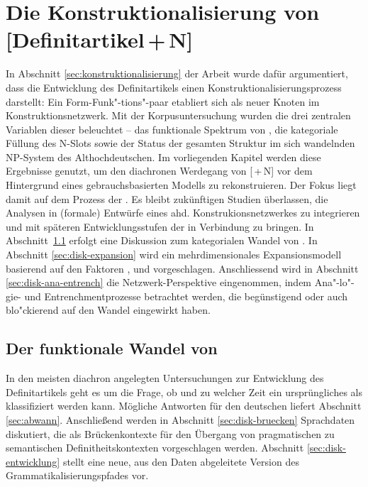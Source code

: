 \chapter{Die Konstruktionalisierung von [Definitartikel\,+\,N]} \label{bicpic}

In Abschnitt \ref{sec:konstruktionalisierung} der Arbeit wurde dafür argumentiert, dass die Entwicklung des Definitartikels  einen Konstruktionalisierungsprozess  darstellt: Ein Form-Funk"-tions"-paar etabliert sich als neuer Knoten im  Konstruktionsnetzwerk. Mit der  Korpusuntersuchung  wurden die drei zentralen Variablen dieser  beleuchtet -- das funktionale Spektrum von , die kategoriale Füllung des N-Slots sowie der Status der gesamten Struktur im sich wandelnden  NP-System  des Althochdeutschen. Im vorliegenden Kapitel werden diese Ergebnisse genutzt, um den diachronen Werdegang von [\,+\,N] vor dem Hintergrund eines gebrauchsbasierten Modells zu rekonstruieren. 
Der Fokus liegt damit auf dem Prozess der . Es bleibt zukünftigen Studien überlassen, die Analysen in (formale) Entwürfe eines ahd. Konstrukionsnetzwerkes  zu integrieren und  mit späteren Entwicklungsstufen der  in Verbindung zu bringen. 
In Abschnitt~\ref{diskussion:der} erfolgt eine Diskussion zum kategorialen Wandel von .  In Abschnitt \ref{sec:disk-expansion} wird ein mehrdimensionales Expansionsmodell  basierend auf den Faktoren ,   und  vorgeschlagen. Anschlies\-send wird in Abschnitt \ref{sec:disk-ana-entrench} die Netzwerk-Perspektive eingenommen, indem Ana"-lo"-gie- und  Entrenchmentprozesse  betrachtet werden, die begünstigend oder auch blo"ckierend auf den Wandel eingewirkt haben. 

\section{Der funktionale Wandel von } \label{diskussion:der}

In den meisten diachron angelegten Untersuchungen zur Entwicklung des Definitartikels  geht es um die Frage, ob und zu welcher Zeit ein ursprüngliches  als  klassifiziert werden kann. Mögliche Antworten für den deutschen  liefert Abschnitt \ref{sec:abwann}. Anschließend werden in Abschnitt \ref{sec:disk-bruecken} Sprachdaten diskutiert, die  als Brückenkontexte  für den Übergang von pragmatischen  zu semantischen  Definitheitskontexten  vorgeschlagen werden. Abschnitt \ref{sec:disk-entwicklung} stellt eine neue, aus den Daten abgeleitete Version des Grammatikalisierungspfades  vor. 

